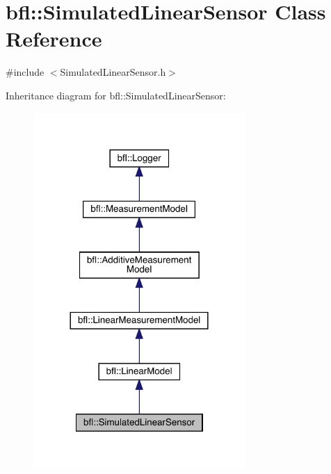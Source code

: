 \hypertarget{classbfl_1_1SimulatedLinearSensor}{}\section{bfl\+:\+:Simulated\+Linear\+Sensor Class Reference}
\label{classbfl_1_1SimulatedLinearSensor}


{\ttfamily \#include $<$Simulated\+Linear\+Sensor.\+h$>$}



Inheritance diagram for bfl\+:\+:Simulated\+Linear\+Sensor\+:
\nopagebreak
\begin{figure}[H]
\begin{center}
\leavevmode
\includegraphics[width=228pt]{classbfl_1_1SimulatedLinearSensor__inherit__graph}
\end{center}
\end{figure}
